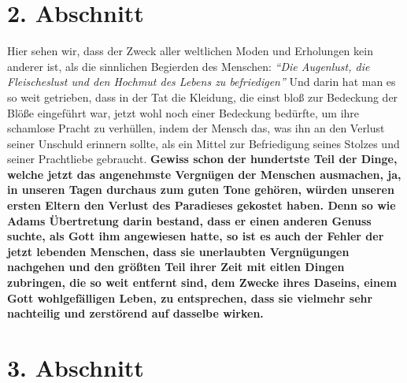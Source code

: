 \section{2. Abschnitt} \label{kap17_ab2}

Hier sehen wir, dass der Zweck aller weltlichen Moden und Erholungen kein
anderer ist, als die sinnlichen Begierden des Menschen:
\textit{"`Die Augenlust, die
Fleischeslust und den Hochmut des Lebens zu befriedigen"'}
Und darin hat man es so weit getrieben, dass in der Tat die Kleidung, die
einst bloß zur Bedeckung der Blöße eingeführt war, jetzt wohl noch einer
Bedeckung bedürfte, um ihre schamlose Pracht zu verhüllen, indem der Mensch das,
was ihn an den Verlust seiner Unschuld erinnern sollte, als ein Mittel zur
Befriedigung seines Stolzes und seiner Prachtliebe gebraucht.
\label{ref:17_02_adam_und_eva}
\textbf{Gewiss schon der
hundertste Teil der Dinge, welche jetzt das angenehmste Vergnügen der Menschen
ausmachen, ja, in unseren Tagen durchaus zum guten Tone gehören, würden unseren
ersten Eltern den Verlust des Paradieses gekostet haben. Denn so wie
Adams
Übertretung darin bestand, dass er einen anderen Genuss suchte, als Gott ihm
angewiesen hatte, so ist es auch der Fehler der jetzt lebenden Menschen, dass
sie
unerlaubten Vergnügungen nachgehen und den größten Teil ihrer Zeit mit eitlen
Dingen zubringen, die so weit entfernt sind, dem Zwecke ihres Daseins, einem
Gott wohlgefälligen Leben, zu entsprechen, dass sie vielmehr sehr nachteilig und
zerstörend auf dasselbe wirken.}

\section{3. Abschnitt} \label{kap17_ab3}

